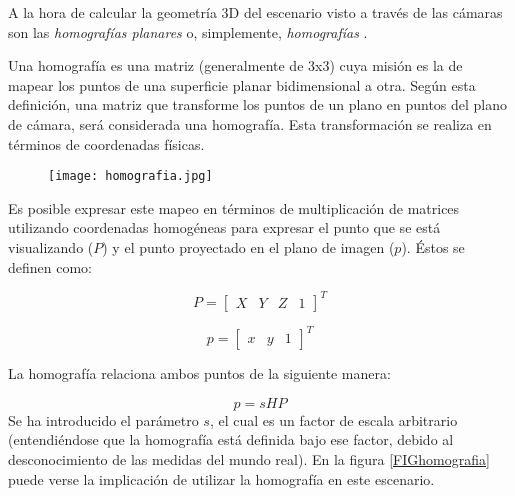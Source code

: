 A la hora de calcular la geometría 3D del escenario visto a través de las cámaras son las \textit{homografías planares} o, simplemente, \textit{homografías} \cite{Martinez03}.






Una homografía es una matriz (generalmente de 3x3) cuya misión es la de mapear los puntos de una superficie planar bidimensional a otra. Según esta definición, una matriz que transforme los puntos de un plano en puntos del plano de cámara, será considerada una homografía. Esta transformación se realiza en términos de coordenadas físicas.

\begin{figure}[tb]
  \begin{minipage}{13.1cm}
    \centering
    \texttt{[image: homografia.jpg]}
  \end{minipage}
\end{figure}

Es posible expresar este mapeo en términos de multiplicación de matrices utilizando coordenadas homogéneas para expresar el punto que se está visualizando ($P$) y el punto proyectado en el plano de imagen ($p$). Éstos se definen como:

\begin{equation}
  P=
  \begin{bmatrix}
    X & Y & Z & 1
  \end{bmatrix}^T
\end{equation}

\begin{equation}
  p=
  \begin{bmatrix}
    x & y & 1
  \end{bmatrix}^T
\end{equation}

La homografía relaciona ambos puntos de la siguiente manera:

\begin{equation}
  p=sHP
\end{equation}
Se ha introducido el parámetro $s$, el cual es un factor de escala arbitrario (entendiéndose que la homografía está definida bajo ese factor, debido al desconocimiento de las medidas del mundo real). En la figura \ref{FIGhomografia} puede verse la implicación de utilizar la homografía en este escenario.

